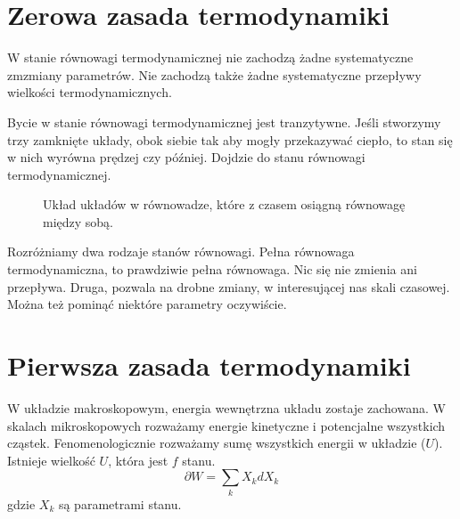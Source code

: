 \documentclass{../notatki}
\begin{document}
\section{Zerowa zasada termodynamiki}

W stanie równowagi termodynamicznej nie zachodzą żadne systematyczne
zmzmiany parametrów. Nie zachodzą także żadne systematyczne przepływy
wielkości termodynamicznych.

Bycie w stanie równowagi termodynamicznej jest tranzytywne. Jeśli stworzymy
trzy zamknięte układy, obok siebie tak aby mogły przekazywać ciepło, to stan
się w nich wyrówna prędzej czy później. Dojdzie do stanu równowagi
termodynamicznej.

\begin{figure}[h]
  \centering
  \caption{Układ układów w równowadze, które z czasem osiągną
  równowagę między sobą.}
\end{figure}

Rozróżniamy dwa rodzaje stanów równowagi. Pełna równowaga termodynamiczna, to
prawdziwie pełna równowaga. Nic się nie zmienia ani przepływa. Druga, pozwala
na drobne zmiany, w interesującej nas skali czasowej. Można też pominąć niektóre
parametry oczywiście.

\section{Pierwsza zasada termodynamiki}

W układzie makroskopowym, energia wewnętrzna układu zostaje zachowana. W skalach
mikroskopowych rozważamy energie kinetyczne i potencjalne wszystkich cząstek.
Fenomenologicznie rozważamy sumę wszystkich energii w układzie ($U$).
Istnieje wielkość $U$, która jest $f$ stanu.
$$
\partial W = \sum_k X_k dX_k
$$
gdzie $X_k$ są parametrami stanu.
\end{document}

